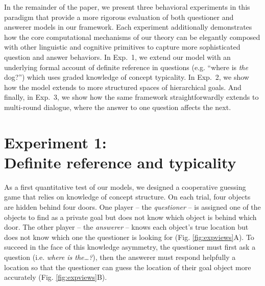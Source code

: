 \documentclass[11pt, floatsintext]{apa6}
\begin{document}


In the remainder of the paper, we present three behavioral experiments in this paradigm that provide a more rigorous evaluation of both questioner and answerer models in our framework.
Each experiment additionally demonstrates how the core computational mechanisms of our theory can be elegantly composed with other linguistic and cognitive primitives to capture more sophisticated question and answer behaviors.
In Exp.~1, we extend our model with an underlying formal account of definite reference in questions (e.g. ``where is \emph{the} dog?'') which uses graded knowledge of concept typicality.
In Exp.~2, we show how the model extends to more structured spaces of hierarchical goals.
And finally, in Exp.~3, we show how the same framework straightforwardly extends to multi-round dialogue, where the answer to one question affects the next.

\section{Experiment 1: \\ Definite reference and typicality}

As a first quantitative test of our models, we designed a cooperative guessing game that relies on knowledge of concept structure. 
On each trial, four objects are hidden behind four doors.
One player -- the \emph{questioner} -- is assigned one of the objects to find as a private goal but does not know which object is behind which door.
The other player -- the \emph{answerer} -- knows each object's true location but does not know which one the questioner is looking for (Fig. \ref{fig:expviews}A). 
To succeed in the face of this knowledge asymmetry, the questioner must first ask a question (i.e. \emph{where is the\dots?}), then the answerer must respond helpfully a location so that the questioner can guess the location of their goal object more accurately (Fig. \ref{fig:expviews}B).
\end{document}
